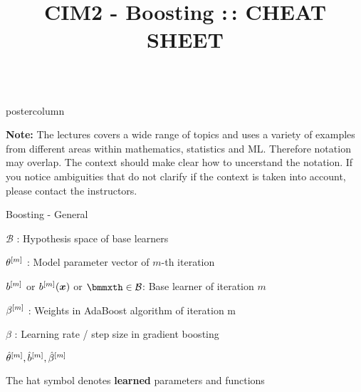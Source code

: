 \documentclass{beamer}
\title{CIM2 - Boosting :\,: CHEAT SHEET} %
\newlength{\columnheight} %
\begin{document}
\begin{frame}[fragile]{}
\begin{columns}
	\begin{column}{.31\textwidth}
		\begin{beamercolorbox}[center]{postercolumn}
			\begin{minipage}{.98\textwidth}
				\parbox[t][\columnheight]{\textwidth}{
					\vspace{1cm}
					\textbf{Note: } The lectures covers a wide range of topics and uses a variety of examples from different areas within mathematics, statistics and ML. Therefore notation may overlap. The context should make clear how to uncerstand the notation. %
					If you notice ambiguities that do not clarify if the context is taken into account, please contact the instructors.
					\begin{myblock}{Boosting - General}
						\begin{codebox}
							$\mathcal{B}$ : Hypothesis space of base learners
						\end{codebox}
						\hspace*{1ex}
						\begin{codebox}
						    $\theta^{[m]}$ : Model parameter vector of $m$-th iteration
						\end{codebox}
						\hspace*{1ex}
						\begin{codebox}
							 $b^{[m]}$ or $b^{[m]} (\bm{x})$ or $\bmmxth \in \mathcal{B}$: Base learner of iteration $m$
						\end{codebox}
						\hspace*{1ex}
						\begin{codebox}
						    $\beta^{[m]}$ :  Weights in AdaBoost algorithm of iteration m
						\end{codebox}
						\hspace*{1ex}
						\begin{codebox}
							$\beta$ : Learning rate / step size in gradient boosting
						\end{codebox}
						\hspace*{1ex} 
						\begin{codebox}
						    $\hat{\theta}^{[m]} , \hat{b}^{[m]} , \hat{\beta}^{[m]}$
						\end{codebox}
						\hspace*{1ex} The hat symbol denotes \textbf{learned} parameters and functions\\
					\end{myblock}
			
}
\end{minipage}
\end{beamercolorbox}
\end{column}
\end{columns}
\end{frame}
\end{document}
